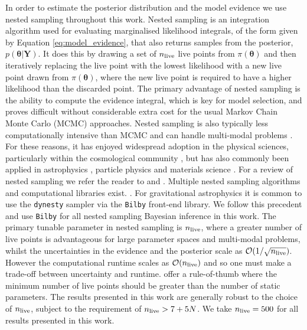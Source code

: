 \documentclass[fleqn,usenatbib,useAMS]{mnras}
\begin{document}
In order to estimate the posterior distribution and the model evidence we use nested sampling \citep{Skilling} throughout this work. Nested sampling is an integration algorithm used for evaluating marginalised likelihood integrals, of the form given by Equation \eqref{eq:model_evidence}, that also returns samples from the posterior, $p(\boldsymbol{\theta} | \boldsymbol{Y})$. It does this by drawing a set of $n_{\rm live}$ live points from $\pi(\boldsymbol{\theta})$ and then iteratively replacing the live point with the lowest likelihood with a new live point drawn from $\pi(\boldsymbol{\theta})$, where the new live point is required to have a higher likelihood than the discarded point. The primary advantage of nested sampling is the ability to compute the evidence integral, which is key for model selection, and proves difficult without considerable extra cost for the usual Markov Chain Monte Carlo (MCMC) approaches. Nested sampling is also typically less computationally intensive than MCMC and can handle multi-modal problems \citep{Ashton2022}. For these reasons, it has enjoyed widespread adoption in the physical sciences, particularly within the cosmological community \citep{Mukherjee2006,Feroz2008,Handley2015}, but has also commonly been applied in astrophysics \citep{UltraNest2021}, particle physics \citep{proceedings2019033014} and materials science \citep{2009arXiv0906materials}. For a review of nested sampling we refer the reader to \cite{Buchner2021} and \cite{Ashton2022}. Multiple nested sampling algorithms and computational libraries exist. \citep[e.g.][]{Feroz2008,Feroz2009,Handley2015,dynesty2020,UltraNest2021}. For gravitational astrophysics it is common to use the \texttt{dynesty} sampler \citep{dynesty2020} via the \texttt{Bilby} \citep{bilby.507.2037A} front-end library. We  follow this precedent and use \texttt{Bilby} for all nested sampling Bayesian inference in this work. The primary tunable parameter in nested sampling is $n_{\rm live}$, where a greater number of live points is advantageous for large parameter spaces and multi-modal problems, whilst the uncertainties in the evidence and the posterior scale as $\mathcal{O}(1/\sqrt{n_{\rm live}})$. However the computational runtime scales as $\mathcal{O}(n_{\rm live})$ and so one must make a trade-off between uncertainty and runtime. \cite{Ashton2022} offer a rule-of-thumb where the minimum number of live points should be greater than the number of static parameters. The results presented in this work are generally robust to the choice of $n_{\rm live}$, subject to the requirement of $n_{\rm live} > 7 + 5N$. We take $n_{\rm live} = 500$ for all results presented in this work. \newline 
\end{document}
